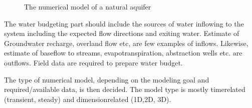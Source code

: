 \documentclass[letterpaper,10pt,english]{jupyterBook}
\begin{document}
\begin{figure}[htbp]
\centering
\capstart

\noindent{}
\caption{The numerical model of a natural aquifer}\label{\detokenize{content/modeling/31_intro_modeling:id2}}\end{figure}

\sphinxAtStartPar
The water budgeting part should include the sources of water inflowing to the system including the expected flow directions and exiting water. Estimate of Groundwater recharge, overland flow etc, are few examples of inflows. Likewise, estimate of baseflow to streams, evapotranspiration, abstraction wells etc. are outflows. Field data are required to prepare water budget.

\sphinxAtStartPar
The type of numerical model, depending on the modeling goal and required/available data, is then decided. The model type is mostly time\sphinxhyphen{}related (transient, steady) and dimension\sphinxhyphen{}related (1D,2D, 3D).
\end{document}
